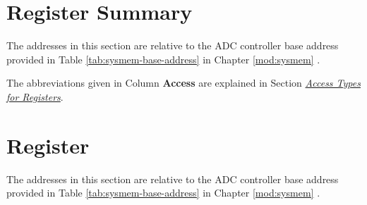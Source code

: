 \documentclass[main\_\_EN.tex]{subfiles}
\begin{document}
\section{Register Summary}

The addresses in this section are relative to the ADC controller base address provided in Table \ref{tab:sysmem-base-address} in Chapter \ref{mod:sysmem} \textit{}.

The abbreviations given in Column \textbf{Access} are explained in Section \hyperref[glossary-access-types]{\textit{Access Types for Registers}}.



\section{Register}

The addresses in this section are relative to the ADC controller base address provided in Table \ref{tab:sysmem-base-address} in Chapter \ref{mod:sysmem} \textit{}.


\end{document}
